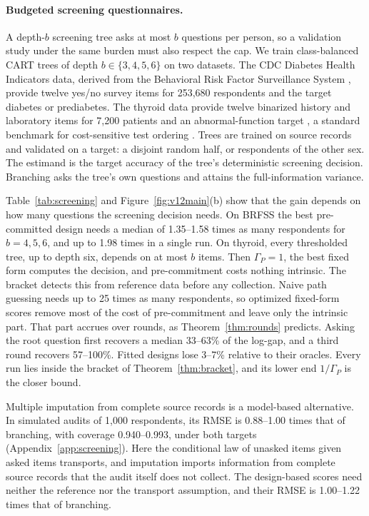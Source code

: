 \paragraph{Budgeted screening questionnaires.}
A depth-$b$ screening tree asks at most $b$ questions per person, so a validation study under the same burden must also respect the cap. We train class-balanced CART trees of depth $b\in\{3,4,5,6\}$ on two datasets. The CDC Diabetes Health Indicators data, derived from the Behavioral Risk Factor Surveillance System \citep{cdcdiabetes2017}, provide twelve yes/no survey items for 253,680 respondents and the target diabetes or prediabetes. The thyroid data provide twelve binarized history and laboratory items for 7,200 patients and an abnormal-function target \citep{quinlan1986thyroid}, a standard benchmark for cost-sensitive test ordering \citep{turney1995}. Trees are trained on source records and validated on a target: a disjoint random half, or respondents of the other sex. The estimand is the target accuracy of the tree's deterministic screening decision. Branching asks the tree's own questions and attains the full-information variance.



Table~\ref{tab:screening} and Figure~\ref{fig:v12main}(b) show that the gain depends on how many questions the screening decision needs. On BRFSS the best pre-committed design needs a median of 1.35--1.58 times as many respondents for $b=4,5,6$, and up to 1.98 times in a single run. On thyroid, every thresholded tree, up to depth six, depends on at most $b$ items. Then $\Gamma_P=1$, the best fixed form computes the decision, and pre-commitment costs nothing intrinsic. The bracket detects this from reference data before any collection. Naive path guessing needs up to 25 times as many respondents, so optimized fixed-form scores remove most of the cost of pre-commitment and leave only the intrinsic part. That part accrues over rounds, as Theorem~\ref{thm:rounds} predicts. Asking the root question first recovers a median 33--63\% of the log-gap, and a third round recovers 57--100\%. Fitted designs lose 3--7\% relative to their oracles. Every run lies inside the bracket of Theorem~\ref{thm:bracket}, and its lower end $1/\Gamma_P$ is the closer bound.

Multiple imputation from complete source records is a model-based alternative. In simulated audits of 1,000 respondents, its RMSE is 0.88--1.00 times that of branching, with coverage 0.940--0.993, under both targets (Appendix~\ref{app:screening}). Here the conditional law of unasked items given asked items transports, and imputation imports information from complete source records that the audit itself does not collect. The design-based scores need neither the reference nor the transport assumption, and their RMSE is 1.00--1.22 times that of branching.

